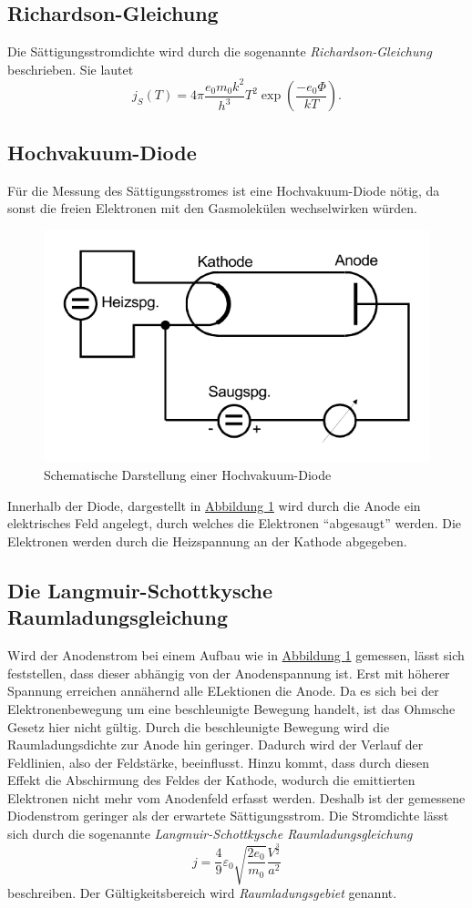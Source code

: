 \subsection{Richardson-Gleichung}
\label{eq:Richardson}
Die Sättigungsstromdichte wird durch die sogenannte \textit{Richardson-Gleichung} \cite{v504} beschrieben. Sie lautet
\begin{equation}
    j_{S}(T)=4 \pi \frac{e_{0} m_{0} k^{2}}{h^{3}} T^{2} \exp \left(\frac{-e_{0} \Phi}{k T}\right) .
\end{equation}
\subsection{Hochvakuum-Diode}
Für die Messung des Sättigungsstromes ist eine Hochvakuum-Diode nötig, da sonst die freien Elektronen mit den Gasmolekülen wechselwirken würden.
\begin{figure} [H]
    \center
    \caption{Schematische Darstellung einer Hochvakuum-Diode}\label{fig:Diode}
    \includegraphics[width=0.5\linewidth]{pictures/Diode.pdf}
\end{figure}
Innerhalb der Diode, dargestellt in \hyperref[fig:Diode]{Abbildung \ref{fig:Diode}} wird durch die Anode ein elektrisches Feld angelegt, durch welches die Elektronen \enquote{abgesaugt} werden.
Die Elektronen werden durch die Heizspannung an der Kathode abgegeben.

\subsection{Die Langmuir-Schottkysche Raumladungsgleichung}\label{eq:Langmuir}
Wird der Anodenstrom bei einem Aufbau wie in \hyperref[fig:Diode]{Abbildung \ref{fig:Diode}} gemessen, lässt sich feststellen,
dass dieser abhängig von der Anodenspannung ist.
Erst mit höherer Spannung erreichen annähernd alle ELektionen die Anode.
Da es sich bei der Elektronenbewegung um eine beschleunigte Bewegung handelt, ist das Ohmsche Gesetz hier nicht gültig.
Durch die beschleunigte Bewegung wird die Raumladungsdichte zur Anode hin geringer.
Dadurch wird der Verlauf der Feldlinien, also der Feldstärke, beeinflusst.
Hinzu kommt, dass durch diesen Effekt die Abschirmung des Feldes der Kathode, wodurch die emittierten
Elektronen nicht mehr vom Anodenfeld erfasst werden.
Deshalb ist der gemessene Diodenstrom geringer als der erwartete Sättigungsstrom.
Die Stromdichte lässt sich durch die sogenannte \textit{Langmuir-Schottkysche Raumladungsgleichung} 
\begin{equation}\label{eq:lsr}
    j=\frac{4}{9} \varepsilon_{0} \sqrt{\frac{2 e_{0} }{ m_{0}}} \frac{V^{\frac{3}{2}}}{a^{2}}
\end{equation}
beschreiben. Der Gültigkeitsbereich wird \textit{Raumladungsgebiet} genannt.

